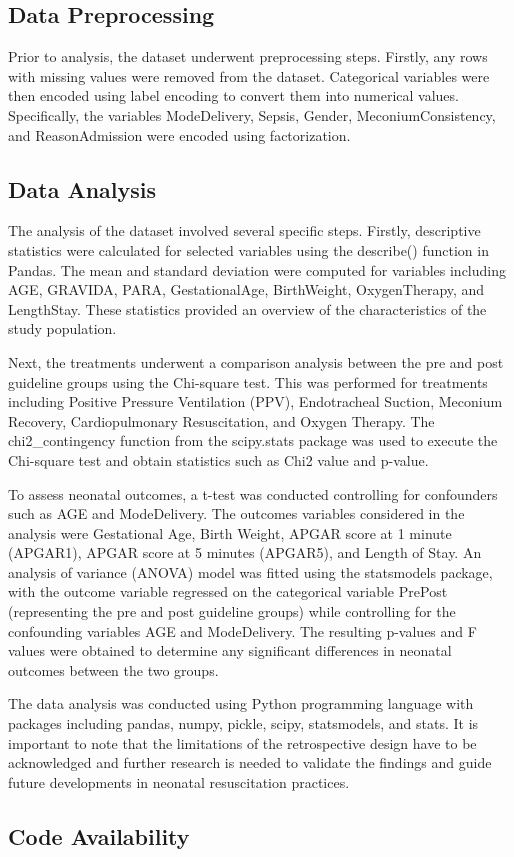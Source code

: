 \documentclass[11pt]{article}
\begin{document}
\subsection*{Data Preprocessing}
Prior to analysis, the dataset underwent preprocessing steps. Firstly, any rows with missing values were removed from the dataset. Categorical variables were then encoded using label encoding to convert them into numerical values. Specifically, the variables ModeDelivery, Sepsis, Gender, MeconiumConsistency, and ReasonAdmission were encoded using factorization. 

\subsection*{Data Analysis}
The analysis of the dataset involved several specific steps. Firstly, descriptive statistics were calculated for selected variables using the describe() function in Pandas. The mean and standard deviation were computed for variables including AGE, GRAVIDA, PARA, GestationalAge, BirthWeight, OxygenTherapy, and LengthStay. These statistics provided an overview of the characteristics of the study population.

Next, the treatments underwent a comparison analysis between the pre and post guideline groups using the Chi-square test. This was performed for treatments including Positive Pressure Ventilation (PPV), Endotracheal Suction, Meconium Recovery, Cardiopulmonary Resuscitation, and Oxygen Therapy. The chi2\_contingency function from the scipy.stats package was used to execute the Chi-square test and obtain statistics such as Chi2 value and p-value.

To assess neonatal outcomes, a t-test was conducted controlling for confounders such as AGE and ModeDelivery. The outcomes variables considered in the analysis were Gestational Age, Birth Weight, APGAR score at 1 minute (APGAR1), APGAR score at 5 minutes (APGAR5), and Length of Stay. An analysis of variance (ANOVA) model was fitted using the statsmodels package, with the outcome variable regressed on the categorical variable PrePost (representing the pre and post guideline groups) while controlling for the confounding variables AGE and ModeDelivery. The resulting p-values and F values were obtained to determine any significant differences in neonatal outcomes between the two groups.

The data analysis was conducted using Python programming language with packages including pandas, numpy, pickle, scipy, statsmodels, and stats. It is important to note that the limitations of the retrospective design have to be acknowledged and further research is needed to validate the findings and guide future developments in neonatal resuscitation practices.\subsection*{Code Availability}
\end{document}
